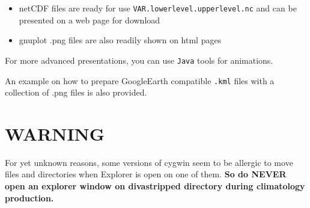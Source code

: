 \documentclass[8pt,a4paper,notitlepage]{book}
\begin{document}
\begin{itemize}
\item netCDF files are ready for use {\tt VAR.lowerlevel.upperlevel.nc} and can be presented on a web page for download
\item gnuplot .png files are also readily shown on html pages 
\end{itemize}

For more advanced presentations, you can use {\tt Java} tools for animations.

An example on how to prepare GoogleEarth compatible {\tt .kml} files with a collection of .png files is also provided.


\section{WARNING}

For yet unknown reasons, some versions of cygwin seem to be allergic to move files and directories when Explorer is open on one of them. {\bf So do NEVER open an
explorer window on divastripped directory during climatology production.}
\end{document}
